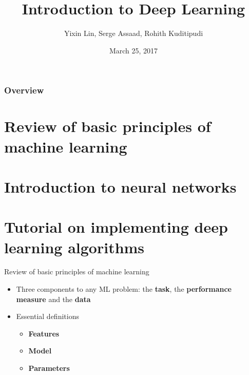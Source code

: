 \documentclass{beamer}
\title[Intro to ML]{Introduction to Deep Learning} %
\author{Yixin Lin, Serge Assaad, Rohith Kuditipudi} %
\institute[Duke] %
{
Duke University \\ %
\medskip
\textit{yixin.lin@duke.edu, serge.assaad@duke.edu, rohith.kuditipudi@duke.edu} %
}
\date{March 25, 2017} %
\begin{document}
\begin{frame}
\titlepage %
\end{frame}

\begin{frame}
\frametitle{Overview} %
\tableofcontents %
\section{Review of basic principles of machine learning}
\section{Introduction to neural networks}
\section{Tutorial on implementing deep learning algorithms}
\end{frame}


\begin{frame}{Review of basic principles of machine learning}
\begin{itemize}
    \item Three components to any ML problem: the \textbf{task}, the \textbf{performance measure} and the \textbf{data}
    \item Essential definitions
    \begin{itemize}
        \item \textbf{Features}
        \item \textbf{Model}
        \item \textbf{Parameters}
        
    \end{itemize}
    
\end{itemize}
    
\end{frame}
\end{document}
